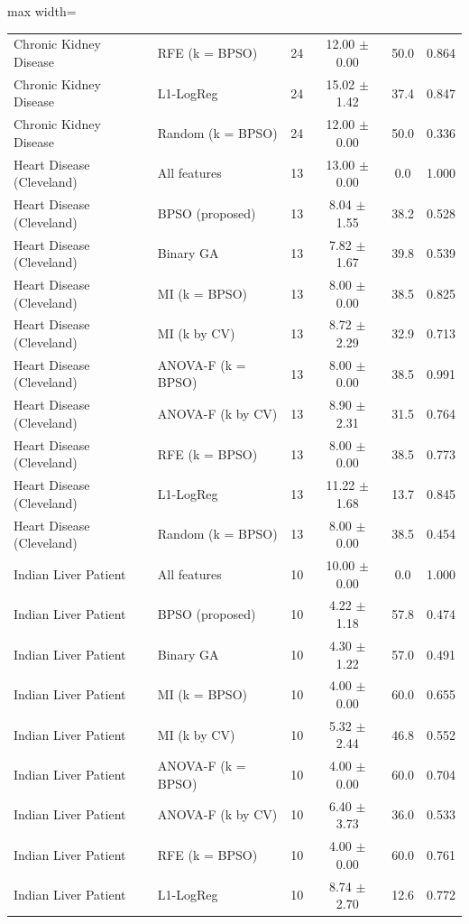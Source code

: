 \begin{table}[!t]
\begin{adjustbox}{max width=\linewidth}
\begin{tabular}{llrccc}
Chronic Kidney Disease & RFE (k = BPSO) & 24 & 12.00 $\pm$ 0.00 & 50.0 & 0.864 \\
Chronic Kidney Disease & L1-LogReg & 24 & 15.02 $\pm$ 1.42 & 37.4 & 0.847 \\
Chronic Kidney Disease & Random (k = BPSO) & 24 & 12.00 $\pm$ 0.00 & 50.0 & 0.336 \\
Heart Disease (Cleveland) & All features & 13 & 13.00 $\pm$ 0.00 & 0.0 & 1.000 \\
Heart Disease (Cleveland) & BPSO (proposed) & 13 & 8.04 $\pm$ 1.55 & 38.2 & 0.528 \\
Heart Disease (Cleveland) & Binary GA & 13 & 7.82 $\pm$ 1.67 & 39.8 & 0.539 \\
Heart Disease (Cleveland) & MI (k = BPSO) & 13 & 8.00 $\pm$ 0.00 & 38.5 & 0.825 \\
Heart Disease (Cleveland) & MI (k by CV) & 13 & 8.72 $\pm$ 2.29 & 32.9 & 0.713 \\
Heart Disease (Cleveland) & ANOVA-F (k = BPSO) & 13 & 8.00 $\pm$ 0.00 & 38.5 & 0.991 \\
Heart Disease (Cleveland) & ANOVA-F (k by CV) & 13 & 8.90 $\pm$ 2.31 & 31.5 & 0.764 \\
Heart Disease (Cleveland) & RFE (k = BPSO) & 13 & 8.00 $\pm$ 0.00 & 38.5 & 0.773 \\
Heart Disease (Cleveland) & L1-LogReg & 13 & 11.22 $\pm$ 1.68 & 13.7 & 0.845 \\
Heart Disease (Cleveland) & Random (k = BPSO) & 13 & 8.00 $\pm$ 0.00 & 38.5 & 0.454 \\
Indian Liver Patient & All features & 10 & 10.00 $\pm$ 0.00 & 0.0 & 1.000 \\
Indian Liver Patient & BPSO (proposed) & 10 & 4.22 $\pm$ 1.18 & 57.8 & 0.474 \\
Indian Liver Patient & Binary GA & 10 & 4.30 $\pm$ 1.22 & 57.0 & 0.491 \\
Indian Liver Patient & MI (k = BPSO) & 10 & 4.00 $\pm$ 0.00 & 60.0 & 0.655 \\
Indian Liver Patient & MI (k by CV) & 10 & 5.32 $\pm$ 2.44 & 46.8 & 0.552 \\
Indian Liver Patient & ANOVA-F (k = BPSO) & 10 & 4.00 $\pm$ 0.00 & 60.0 & 0.704 \\
Indian Liver Patient & ANOVA-F (k by CV) & 10 & 6.40 $\pm$ 3.73 & 36.0 & 0.533 \\
Indian Liver Patient & RFE (k = BPSO) & 10 & 4.00 $\pm$ 0.00 & 60.0 & 0.761 \\
Indian Liver Patient & L1-LogReg & 10 & 8.74 $\pm$ 2.70 & 12.6 & 0.772 \\

\end{tabular}
\end{adjustbox}
\end{table}

